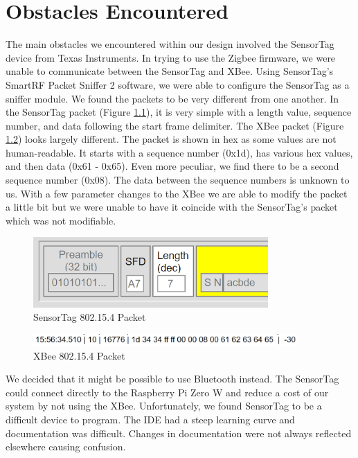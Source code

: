 \chapter{Obstacles Encountered}

The main obstacles we encountered within our design involved the SensorTag device from Texas Instruments. In trying to use the Zigbee firmware, we were unable to communicate between the SensorTag and XBee. Using SensorTag’s SmartRF Packet Sniffer 2 software, we were able to configure the SensorTag as a sniffer module. We found the packets to be very different from one another. In the SensorTag packet (Figure \ref{fig:sensortag}), it is very simple with a length value, sequence number, and data following the start frame delimiter. The XBee packet (Figure \ref{fig:xbee}) looks largely different. The packet is shown in hex as some values are not human-readable. It starts with a sequence number (0x1d), has various hex values, and then data (0x61 - 0x65). Even more peculiar, we find there to be a second sequence number (0x08). The data between the sequence numbers is unknown to us. With a few parameter changes to the XBee we are able to modify the packet a little bit but we were unable to have it coincide with the SensorTag’s packet which was not modifiable.

\begin{figure}[h]
  \includegraphics[width=0.8\textwidth]{SensorTag-packet.png}
  \centering
  \caption{SensorTag 802.15.4 Packet}
  \label{fig:sensortag}
\end{figure}

\begin{figure}[h]
  \includegraphics[width=0.9\textwidth]{XBee-packet.PNG}
  \centering
  \caption{XBee 802.15.4 Packet}
  \label{fig:xbee}
\end{figure}

We decided that it might be possible to use Bluetooth instead. The SensorTag could connect directly to the Raspberry Pi Zero W and reduce a cost of our system by not using the XBee. Unfortunately, we found SensorTag to be a difficult device to program. The IDE had a steep learning curve and documentation was difficult. Changes in documentation were not always reflected elsewhere causing confusion.